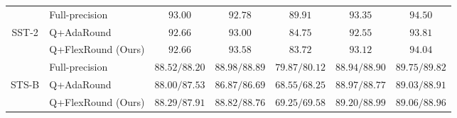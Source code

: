 \documentclass{article}
\theoremstyle{plain}
\theoremstyle{definition}
\theoremstyle{remark}
\begin{document}
\begin{table}[h]
\begin{center}
\begin{tabular}{clccccc}
\midrule
& Full-precision & $93.00$ & $92.78$ & $89.91$ & $93.35$ & $94.50$ \\
\cmidrule{2-7}
SST-2 & Q+AdaRound & $92.66$ & $93.00$ & $\mathbf{84.75}$ & $92.55$ & $93.81$ \\
& Q+FlexRound (Ours)& $\mathbf{92.66}$ & $\mathbf{93.58}$ & $83.72$ & $\mathbf{93.12}$ & $\mathbf{94.04}$ \\
\midrule
& Full-precision & $88.52 / 88.20$ & $88.98 / 88.89$ & $79.87 / 80.12$ & $88.94 / 88.90$ & $89.75 / 89.82$ \\ 
\cmidrule{2-7}
STS-B & Q+AdaRound & $88.00 / 87.53$ & $86.87 / 86.69$ & $68.55 / 68.25$ & $88.97 / 88.77$ & $89.03 / 88.91$ \\
& Q+FlexRound (Ours)& $\mathbf{88.29} / \mathbf{87.91}$ & $\mathbf{88.82} / \mathbf{88.76}$ & $\mathbf{69.25} / \mathbf{69.58}$ & $\mathbf{89.20} / \mathbf{88.99}$ & $\mathbf{89.06} / \mathbf{88.96}$ \\

\bottomrule
\end{tabular}
\end{center}
\end{table}

\newpage


\end{document}
